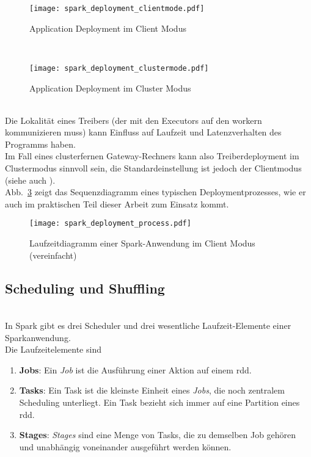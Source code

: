 \begin{figure}[ht!]
	\centering
  \texttt{[image: spark\_deployment\_clientmode.pdf]}
	\caption{Application Deployment im Client Modus}
	\label{fig:spark_deployment_clientmode}
\end{figure}\\

\begin{figure}[ht!]
	\centering
  \texttt{[image: spark\_deployment\_clustermode.pdf]}
	\caption{Application Deployment im Cluster Modus}
	\label{fig:spark_deployment_clustermode}
\end{figure}\\

Die Lokalität eines Treibers (der mit den Executors auf den \gls{worker}n kommunizieren muss) kann Einfluss auf Laufzeit und Latenzverhalten des Programms haben.\\

Im Fall eines clusterfernen Gateway-Rechners kann also Treiberdeployment im Clustermodus sinnvoll sein, die Standardeinstellung ist jedoch der Clientmodus (siehe auch \cite{spark_submission}).\\

Abb.~\ref{fig:app_deployment_process} zeigt das Sequenzdiagramm eines typischen Deploymentprozesses, wie er auch im praktischen Teil dieser Arbeit zum Einsatz kommt.

\begin{figure}[ht!]
	\centering
  \texttt{[image: spark\_deployment\_process.pdf]}
	\caption{Laufzeitdiagramm einer Spark-Anwendung im Client Modus (vereinfacht)}
	\label{fig:app_deployment_process}
\end{figure}


\subsection{Scheduling und Shuffling}\\

In Spark gibt es drei Scheduler und drei wesentliche Laufzeit-Elemente einer Sparkanwendung.\\

Die Laufzeitelemente sind
\begin{enumerate}
	\item \textbf{Jobs}: Ein \textit{Job} ist die Ausführung einer Aktion auf einem \gls{rdd}.
	\item \textbf{Tasks}: Ein Task ist die kleinste Einheit eines \textit{Jobs}, die noch zentralem Scheduling unterliegt. Ein Task bezieht sich immer auf eine Partition eines \gls{rdd}.
	\item \textbf{Stages}: \textit{Stages} sind eine Menge von Tasks, die zu demselben Job gehören und unabhängig voneinander ausgeführt werden können.
\end{enumerate}

